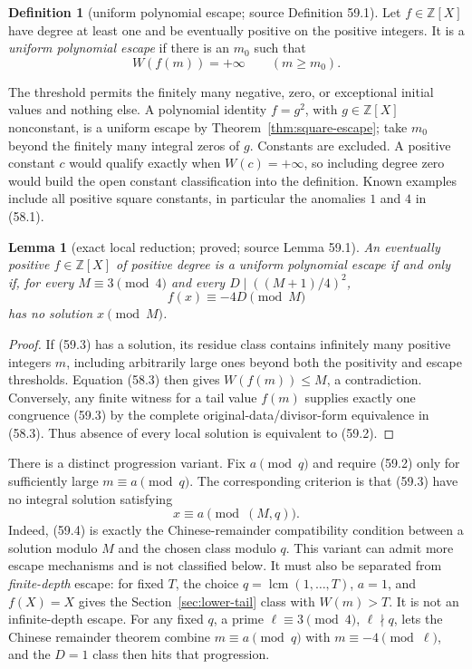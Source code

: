 \documentclass[10pt,reqno]{amsart}
\newtheorem{lemma}[theorem]{Lemma}
\theoremstyle{definition}
\newtheorem{definition}[theorem]{Definition}
\newcommand{\lcm}{\operatorname {lcm}}
\newcommand{\1}{\mathbf 1}
\begin{document}
\begin{definition}[uniform polynomial escape; source Definition 59.1]
\label{def:uniform-polynomial-escape}
Let $f\in\mathbb Z[X]$ have degree at least one and be eventually positive
on the positive integers.  It is a \emph{uniform polynomial escape} if there
is an $m_0$ such that
\begin{equation}\tag{59.2}
                       W(f(m))=+\infty\qquad(m\geq m_0).
\end{equation}
\end{definition}
The threshold permits the finitely many negative, zero, or exceptional
initial values and nothing else.  A polynomial identity $f=g^2$, with
$g\in\mathbb Z[X]$ nonconstant, is a uniform escape by
Theorem~\ref{thm:square-escape}; take $m_0$ beyond the finitely many integral
zeros of $g$.  Constants are excluded.  A positive constant $c$ would
qualify exactly when $W(c)=+\infty$, so including degree zero would build the
open constant classification into the definition.  Known examples include
all positive square constants, in particular the anomalies $1$ and $4$ in
(58.1).

\begin{lemma}[exact local reduction; proved; source Lemma 59.1]
\label{lem:polynomial-local}
An eventually positive $f\in\mathbb Z[X]$ of positive degree is a uniform
polynomial escape if and only if, for every $M\equiv3\pmod4$ and every
$D\mid((M+1)/4)^2$,
\begin{equation}\tag{59.3}
                         f(x)\equiv-4D\pmod M
\end{equation}
has no solution $x\pmod M$.
\end{lemma}
\begin{proof}
If (59.3) has a solution, its residue class contains infinitely many positive
integers $m$, including arbitrarily large ones beyond both the positivity and
escape thresholds.  Equation (58.3) then gives $W(f(m))\leq M$, a
contradiction.  Conversely, any finite witness for a tail value $f(m)$
supplies exactly one congruence (59.3) by the complete
original-data/divisor-form equivalence in (58.3).  Thus absence of every
local solution is equivalent to (59.2).
\end{proof}

There is a distinct progression variant.  Fix $a\pmod q$ and require (59.2)
only for sufficiently large $m\equiv a\pmod q$.  The corresponding criterion
is that (59.3) have no integral solution satisfying
\begin{equation}\tag{59.4}
                         x\equiv a\pmod{(M,q)}.
\end{equation}
Indeed, (59.4) is exactly the Chinese-remainder compatibility condition
between a solution modulo $M$ and the chosen class modulo $q$.  This variant
can admit more escape mechanisms and is not classified below.  It must also
be separated from \emph{finite-depth} escape: for fixed $T$, the choice
$q=\lcm(1,\ldots,T)$, $a=1$, and $f(X)=X$ gives the
Section~\ref{sec:lower-tail} class with $W(m)>T$.  It is not an
infinite-depth escape.  For any fixed $q$, a prime
$\ell\equiv3\pmod4$, $\ell\nmid q$, lets the Chinese remainder theorem
combine $m\equiv a\pmod q$ with $m\equiv-4\pmod\ell$, and the $D=1$ class
then hits that progression.
\end{document}
